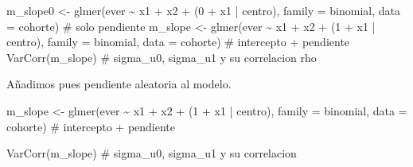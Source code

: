 \documentclass[
  letterpaper,
  DIV=11,
  numbers=noendperiod]{scrartcl}
\newenvironment{Shaded}{\begin{snugshade}}{\end{snugshade}}
\newcommand{\AttributeTok}[1]{\textcolor[rgb]{0.40,0.45,0.13}{#1}}
\newcommand{\CommentTok}[1]{\textcolor[rgb]{0.37,0.37,0.37}{#1}}
\newcommand{\DecValTok}[1]{\textcolor[rgb]{0.68,0.00,0.00}{#1}}
\newcommand{\FunctionTok}[1]{\textcolor[rgb]{0.28,0.35,0.67}{#1}}
\newcommand{\NormalTok}[1]{\textcolor[rgb]{0.00,0.23,0.31}{#1}}
\newcommand{\OtherTok}[1]{\textcolor[rgb]{0.00,0.23,0.31}{#1}}
\newcommand{\SpecialCharTok}[1]{\textcolor[rgb]{0.37,0.37,0.37}{#1}}
\begin{document}
\begin{tcolorbox}[enhanced jigsaw, coltitle=black, rightrule=.15mm, arc=.35mm, leftrule=.75mm, colback=white, colbacktitle=quarto-callout-tip-color!10!white, left=2mm, breakable, toptitle=1mm, toprule=.15mm, bottomtitle=1mm, titlerule=0mm, title=\textcolor{quarto-callout-tip-color}{\faLightbulb}\hspace{0.5em}{🔧 En R. Añadir una pendiente aleatoria}, bottomrule=.15mm, opacityback=0, opacitybacktitle=0.6, colframe=quarto-callout-tip-color-frame]

\begin{Shaded}
\begin{Highlighting}[]
\NormalTok{m\_slope0 }\OtherTok{\textless{}{-}} \FunctionTok{glmer}\NormalTok{(ever }\SpecialCharTok{\textasciitilde{}}\NormalTok{ x1 }\SpecialCharTok{+}\NormalTok{ x2 }\SpecialCharTok{+}\NormalTok{ (}\DecValTok{0} \SpecialCharTok{+}\NormalTok{ x1 }\SpecialCharTok{|}\NormalTok{ centro), }\AttributeTok{family =}\NormalTok{ binomial, }\AttributeTok{data =}\NormalTok{ cohorte)  }\CommentTok{\# solo pendiente}
\NormalTok{m\_slope  }\OtherTok{\textless{}{-}} \FunctionTok{glmer}\NormalTok{(ever }\SpecialCharTok{\textasciitilde{}}\NormalTok{ x1 }\SpecialCharTok{+}\NormalTok{ x2 }\SpecialCharTok{+}\NormalTok{ (}\DecValTok{1} \SpecialCharTok{+}\NormalTok{ x1 }\SpecialCharTok{|}\NormalTok{ centro), }\AttributeTok{family =}\NormalTok{ binomial, }\AttributeTok{data =}\NormalTok{ cohorte)  }\CommentTok{\# intercepto + pendiente}
\FunctionTok{VarCorr}\NormalTok{(m\_slope)   }\CommentTok{\# sigma\_u0, sigma\_u1 y su correlacion rho}
\end{Highlighting}
\end{Shaded}

\end{tcolorbox}

Añadimos pues pendiente aleatoria al modelo.

\begin{Shaded}
\begin{Highlighting}[]
\NormalTok{m\_slope  }\OtherTok{\textless{}{-}} \FunctionTok{glmer}\NormalTok{(ever }\SpecialCharTok{\textasciitilde{}}\NormalTok{ x1 }\SpecialCharTok{+}\NormalTok{ x2 }\SpecialCharTok{+}\NormalTok{ (}\DecValTok{1} \SpecialCharTok{+}\NormalTok{ x1 }\SpecialCharTok{|}\NormalTok{ centro), }\AttributeTok{family =}\NormalTok{ binomial, }\AttributeTok{data =}\NormalTok{ cohorte)  }\CommentTok{\# intercepto + pendiente}

\FunctionTok{VarCorr}\NormalTok{(m\_slope)        }\CommentTok{\# sigma\_u0, sigma\_u1 y su correlacion}
\end{Highlighting}
\end{Shaded}
\end{document}
